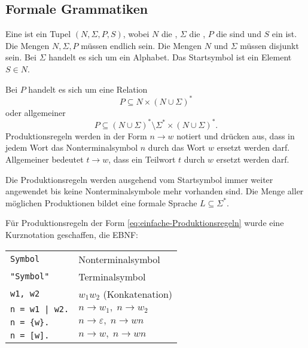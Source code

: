 \subsection{Formale Grammatiken}
\begin{definition}
Eine  ist ein Tupel $(N,\Sigma,P,S)$,
wobei $N$ die ,
$\Sigma$ die ,
$P$ die  sind
und $S$ ein  ist.
Die Mengen $N,\Sigma,P$ müssen endlich sein. Die Mengen $N$ und
$\Sigma$ müssen disjunkt sein. Bei $\Sigma$ handelt es sich um
ein Alphabet. Das Startsymbol ist ein Element $S\in N$.

Bei $P$ handelt es sich um eine Relation
\begin{equation}\label{eq:einfache-Produktionsregeln}
P\subseteq N\times (N\cup\Sigma)^*
\end{equation}
oder allgemeiner
\begin{equation}
P\subseteq (N\cup\Sigma)^*\setminus\Sigma^*\times (N\cup\Sigma)^*.
\end{equation}
Produktionsregeln werden in der Form $n\to w$ notiert und drücken aus,
dass in jedem Wort das Nonterminalsymbol $n$ durch das Wort $w$ ersetzt
werden darf. Allgemeiner bedeutet $t\to w$, dass ein Teilwort $t$
durch $w$ ersetzt werden darf.

Die Produktionsregeln werden ausgehend vom Startsymbol immer weiter
angewendet bis keine Nonterminalsymbole mehr vorhanden sind.
Die Menge aller möglichen Produktionen bildet
eine formale Sprache $L\subseteq\Sigma^*$.
\end{definition}

Für Produktionsregeln der Form \eqref{eq:einfache-Produktionsregeln}
wurde eine Kurznotation geschaffen, die EBNF:

\begin{tabular}{l|l}
\verb|Symbol| & Nonterminalsymbol\\
\verb|"Symbol"| & Terminalsymbol\\
\verb|w1, w2| & $w_1w_2$ (Konkatenation)\\
\verb/n = w1 | w2./ & $n\to w_1,\; n\to w_2$\\
\verb|n = {w}.| & $n\to \varepsilon,\; n\to wn$\\
\verb|n = [w].| & $n\to w,\; n\to wn$
\end{tabular}


